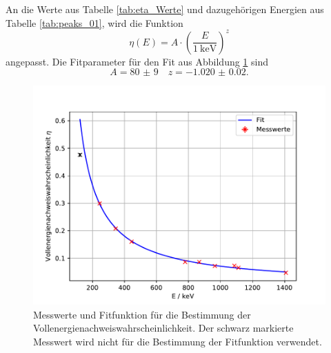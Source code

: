An die Werte aus Tabelle \ref{tab:eta_Werte} und dazugehörigen Energien aus Tabelle \ref{tab:peaks_01}, wird die Funktion
\begin{equation*}
  \eta(E) = A\cdot \left(\frac{E}{\SI{1}{\kilo\eV}}\right)^z
\end{equation*}
angepasst. 
Die Fitparameter für den Fit aus Abbildung \ref{fig:Vollenergienachweiswahrscheinlichkeit} sind 
\begin{equation*}
  A = \num{80(9)} \quad z = \num{-1.020(20)}.
\end{equation*}
\begin{figure}
  \centering
  \caption{Messwerte und Fitfunktion für die Bestimmung der Vollenergienachweiswahrscheinlichkeit. Der schwarz markierte Messwert wird nicht für die Bestimmung der Fitfunktion verwendet.}
  \label{fig:Vollenergienachweiswahrscheinlichkeit}
  \includegraphics[width = \textwidth, keepaspectratio]{figure/Vollenergienachweiswahrscheinlichkeit.pdf}
\end{figure}
\FloatBarrier

